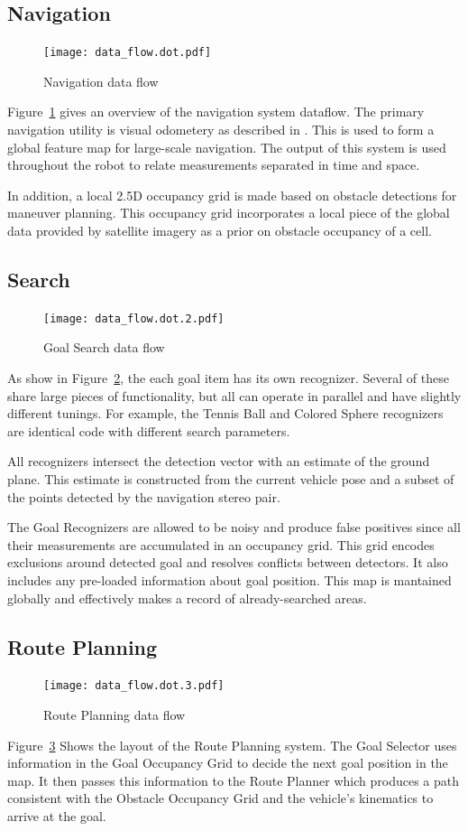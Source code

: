 \documentclass[12pt]{article}
\begin{document}
\subsection{Navigation}\label{Navigation}
\begin{figure}
\centering
\texttt{[image: data\_flow.dot.pdf]}
\caption{Navigation data flow}
\label{fig_df_nav}
\end{figure}
Figure~\ref{fig_df_nav} gives an overview of the navigation system dataflow. The primary navigation utility is visual odometery as described in \cite{KKonoLSVO}. This is used to form a global feature map for large-scale navigation. The output of this system is used throughout the robot to relate measurements separated in time and space.

In addition, a local 2.5D occupancy grid is made based on obstacle detections for maneuver planning. This occupancy grid incorporates a local piece of the global data provided by satellite imagery as a prior on obstacle occupancy of a cell.

\subsection{Search}\label{Search}
\begin{figure}
\centering
\texttt{[image: data\_flow.dot.2.pdf]}
\caption{Goal Search data flow}
\label{fig_df_gs}
\end{figure}
As show in Figure~\ref{fig_df_gs}, the each goal item has its own recognizer. Several of these share large pieces of functionality, but all can operate in parallel and have slightly different tunings. For example, the Tennis Ball and Colored Sphere recognizers are identical code with different search parameters.

All recognizers intersect the detection vector with an estimate of the ground plane. This estimate is constructed from the current vehicle pose and a subset of the points detected by the navigation stereo pair.

The Goal Recognizers are allowed to be noisy and produce false positives since all their measurements are accumulated in an occupancy grid. This grid encodes exclusions around detected goal and resolves conflicts between detectors. It also includes any pre-loaded information about goal position. This map is mantained globally and effectively makes a record of already-searched areas.

\subsection{Route Planning}
\begin{figure}
\centering
\texttt{[image: data\_flow.dot.3.pdf]}
\caption{Route Planning data flow}
\label{fig_df_rp}
\end{figure}
Figure~\ref{fig_df_rp} Shows the layout of the Route Planning system. The Goal Selector uses information in the Goal Occupancy Grid to decide the next goal position in the map. It then passes this information to the Route Planner which produces a path consistent with the Obstacle Occupancy Grid and the vehicle's kinematics to arrive at the goal.
\end{document}
